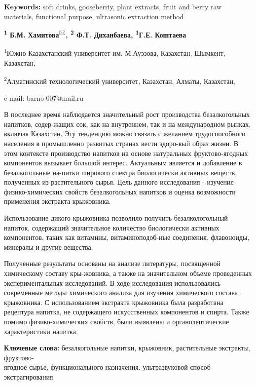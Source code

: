 {\bfseries Keywords:} soft drinks, gooseberriy, plant extracts, fruit and
berry raw materials, functional purpose, ultrasonic extraction method

\begin{center}

{\bfseries \textsuperscript{1} Б.М. Хамитова}\textsuperscript{🖂}{\bfseries ,
\textsuperscript{2} Ф.Т. Диханбаева, \textsuperscript{1}Г.Е. Коштаева}

\textsuperscript{1}Южно-Казахстанский университет им. М.Ауэзова,
Казахстан, Шымкент, Казахстан,

\textsuperscript{2}Алматинский технологический университет, Казахстан,
Алматы, Казахстан,

e-mail: barno-007@mail.ru
\end{center}

В последнее время наблюдается значительный рост производства
безалкогольных напитков, содер-жащих сок, как на внутреннем, так и на
международном рынках, включая Казахстан. Эту тенденцию можно связать с
желанием трудоспособного населения в промышленно развитых странах вести
здоро-вый образ жизни. В этом контексте производство напитков на основе
натуральных фруктово-ягодных компонентов вызывает большой интерес.
Актуальным является и добавление в безалкогольные на-питки широкого
спектра биологически активных веществ, полученных из растительного
сырья. Цель данного исследования - изучение физико-химических свойств
безалкогольных напитков и оценка возможности применения экстракта
крыжовника.

Использование дикого крыжовника позволило получить безалкологольный
напиток, содержащий значительное количество биологически активных
компонентов, таких как витамины, витаминоподоб-ные соединения,
флавоноиды, минералы и другие вещества.

Полученные результаты основаны на анализе литературы, посвященной
химическому составу кры-жовника, а также на значительном объеме
проведенных экспериментальных исследований. В ходе исследования
использовались современные методы химического анализа для изучения
химического состава крыжовника. С использованием экстракта крыжовника
была разработана рецептура напитка, не содержащего искусственных
компонентов и спирта. Также помимо физико-химических свойств, были
выявлены и органолептические характеристики напитка.

{\bfseries Ключевые слова:} безалкогольные напитки, крыжовник, растительные
экстракты, фруктово-\\ягодное сырье, функционального назначения,
ультразвуковой способ экстрагирования

